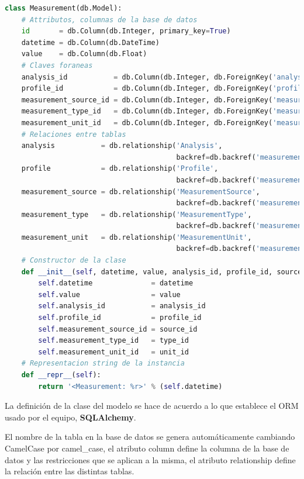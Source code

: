 \documentclass[a4paper,12pt]{article}
\begin{document}
\begin{itemize}
\begin{lstlisting}[language=Python]
class Measurement(db.Model):
    # Attributos, columnas de la base de datos
    id       = db.Column(db.Integer, primary_key=True)
    datetime = db.Column(db.DateTime)
    value    = db.Column(db.Float)
    # Claves foraneas
    analysis_id           = db.Column(db.Integer, db.ForeignKey('analysis.id'))
    profile_id            = db.Column(db.Integer, db.ForeignKey('profile.id'))
    measurement_source_id = db.Column(db.Integer, db.ForeignKey('measurement_source.id'))
    measurement_type_id   = db.Column(db.Integer, db.ForeignKey('measurement_type.id'))
    measurement_unit_id   = db.Column(db.Integer, db.ForeignKey('measurement_unit.id'))
    # Relaciones entre tablas
    analysis           = db.relationship('Analysis',
                                         backref=db.backref('measurements', lazy='dynamic'))
    profile            = db.relationship('Profile',
                                         backref=db.backref('measurements', lazy='dynamic'))
    measurement_source = db.relationship('MeasurementSource',
                                         backref=db.backref('measurements', lazy='dynamic'))
    measurement_type   = db.relationship('MeasurementType',
                                         backref=db.backref('measurements', lazy='dynamic'))
    measurement_unit   = db.relationship('MeasurementUnit',
                                         backref=db.backref('measurements', lazy='dynamic'))
    # Constructor de la clase
    def __init__(self, datetime, value, analysis_id, profile_id, source_id, type_id, unit_id):
        self.datetime              = datetime
        self.value                 = value
        self.analysis_id           = analysis_id
        self.profile_id            = profile_id
        self.measurement_source_id = source_id
        self.measurement_type_id   = type_id
        self.measurement_unit_id   = unit_id
    # Representacion string de la instancia
    def __repr__(self):
        return '<Measurement: %r>' % (self.datetime)
\end{lstlisting}

La definición de la clase del modelo se hace de acuerdo a lo que establece el ORM usado por el equipo, \textbf{SQLAlchemy}.

El nombre de la tabla en la base de datos se genera automáticamente cambiando CamelCase por camel\_case, el atributo column define la columna de la base de datos y las restricciones que se aplican a la misma, el atributo relationship define la relación entre las distintas tablas.


\end{itemize}
\end{document}

